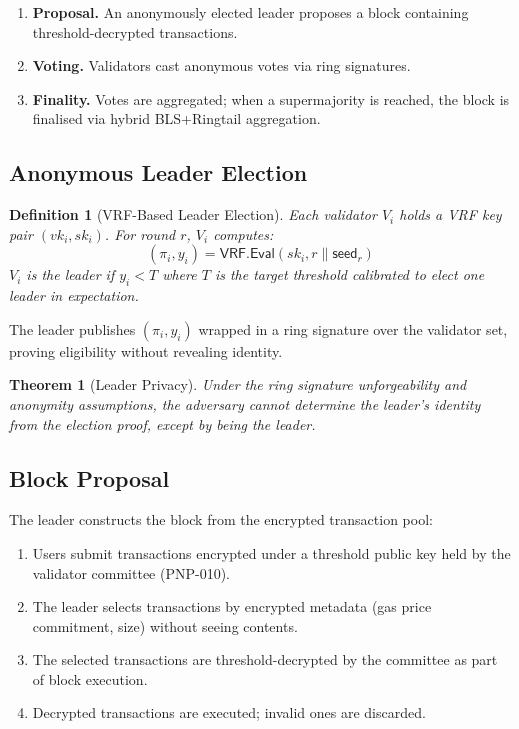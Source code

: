 \documentclass[11pt,a4paper]{article}
\newtheorem{definition}{Definition}[section]
\newtheorem{theorem}{Theorem}[section]
\begin{document}
\begin{enumerate}
    \item \textbf{Proposal.}  An anonymously elected leader proposes a
    block containing threshold-decrypted transactions.
    \item \textbf{Voting.}  Validators cast anonymous votes via ring
    signatures.
    \item \textbf{Finality.}  Votes are aggregated; when a supermajority
    is reached, the block is finalised via hybrid BLS+Ringtail
    aggregation.
\end{enumerate}

\subsection{Anonymous Leader Election}

\begin{definition}[VRF-Based Leader Election]
    Each validator $V_i$ holds a VRF key pair $(vk_i, sk_i)$.  For
    round $r$, $V_i$ computes:
    \[
        (\pi_i, y_i) = \mathsf{VRF.Eval}(sk_i, r \| \mathsf{seed}_r)
    \]
    $V_i$ is the leader if $y_i < T$ where $T$ is the target threshold
    calibrated to elect one leader in expectation.
\end{definition}

The leader publishes $(\pi_i, y_i)$ wrapped in a ring signature over
the validator set, proving eligibility without revealing identity.

\begin{theorem}[Leader Privacy]
    Under the ring signature unforgeability and anonymity assumptions,
    the adversary cannot determine the leader's identity from the
    election proof, except by being the leader.
\end{theorem}

\subsection{Block Proposal}

The leader constructs the block from the encrypted transaction pool:

\begin{enumerate}
    \item Users submit transactions encrypted under a threshold public
    key held by the validator committee (PNP-010).
    \item The leader selects transactions by encrypted metadata
    (gas price commitment, size) without seeing contents.
    \item The selected transactions are threshold-decrypted by the
    committee as part of block execution.
    \item Decrypted transactions are executed; invalid ones are discarded.
\end{enumerate}
\end{document}
